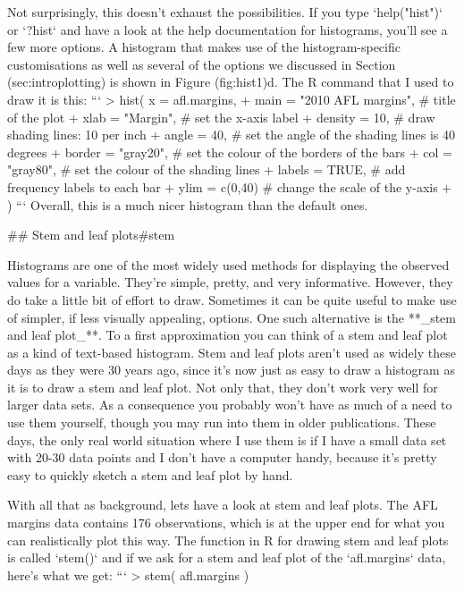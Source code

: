 Not surprisingly, this doesn't exhaust the possibilities. If you type `help("hist")` or `?hist` and have a look at the help documentation for histograms, you'll see a few more options. A histogram that makes use of the histogram-specific customisations as well as several of the options we discussed in Section \@ref(sec:introplotting) is shown in Figure \@ref(fig:hist1)d. The R command that I used to draw it is this:
```
> hist( x = afl.margins, 
+       main = "2010 AFL margins", # title of the plot
+       xlab = "Margin",           # set the x-axis label
+       density = 10,              # draw shading lines: 10 per inch
+       angle = 40,                # set the angle of the shading lines is 40 degrees
+       border = "gray20",         # set the colour of the borders of the bars
+       col = "gray80",            # set the colour of the shading lines
+       labels = TRUE,             # add frequency labels to each bar
+       ylim = c(0,40)             # change the scale of the y-axis
+ )
```
Overall, this is a much nicer histogram than the default ones.


## Stem and leaf plots{#stem}

Histograms are one of the most widely used methods for displaying the observed values for a variable. They're simple, pretty, and very informative. However, they do take a little bit of effort to draw. Sometimes it can be quite useful to make use of simpler, if less visually appealing, options. One such alternative is the **_stem and leaf plot_**. To a first approximation you can think of a stem and leaf plot as a kind of text-based histogram. Stem and leaf plots aren't used as widely these days as they were 30 years ago, since it's now just as easy to draw a histogram as it is to draw a stem and leaf plot. Not only that, they don't work very well for larger data sets. As a consequence you probably won't have as much of a need to use them yourself, though you may run into them in older publications. These days, the only real world situation where I use them is if I have a small data set with 20-30 data points and I don't have a computer handy, because it's pretty easy to quickly sketch a stem and leaf plot by hand. 

With all that as background, lets have a look at stem and leaf plots. The AFL margins data contains 176 observations, which is at the upper end for what you can realistically plot this way. The function in R for drawing stem and leaf plots is called `stem()` and if we ask for a stem and leaf plot of the `afl.margins` data, here's what we get:
```
> stem( afl.margins )

